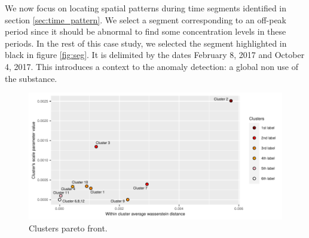 
We now focus on locating spatial patterns during time segments identified in section \ref{sec:time_pattern}. We select a segment corresponding to an off-peak period since it should be abnormal to find some concentration levels in these periods. In the rest of this case study, we selected the segment highlighted in black in figure \ref{fig:seg}. It is delimited by the dates February 8, 2017 and October 4, 2017. 
This introduces a context to the anomaly detection: a global non use of the substance. 

\begin{figure}[htbp]
  \centering
  \includegraphics[]{figs/Chap5/Pareto_plot.pdf}
  \caption{Clusters pareto front.}
  \label{fig:pareto:plot}
\end{figure}


